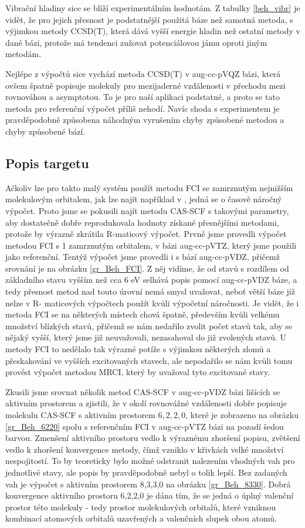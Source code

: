 Vibrační hladiny sice se blíží experimentálním hodnotám. Z tabulky \ref{beh_vibr} je 
vidět, že pro jejich přesnost je podstatnější použitá báze než samotná metoda, s 
výjimkou metody CCSD(T), která dává vyšší energie hladin než ostatní metody v dané 
bázi, protože má tendenci zužovat potenciálovou jámu oproti jiným metodám.

Nejlépe z výpočtů sice vychází metoda CCSD(T) v aug-cc-pVQZ bázi, která ovšem špatně popisuje
molekuly pro mezijaderné vzdálenosti v přechodu mezi rovnováhou a asymptotou.
To je pro naší aplikaci podstatné, a proto se tato metoda pro referenční výpočet příliš 
nehodí. Navíc shoda s experimentem je pravděpodobně způsobena náhodným vyrušením chyby způsobené metodou a chyby způsobené bází.

\subsection{Popis targetu}
Ačkoliv lze pro takto malý systém použít metodu FCI se zamrznutým nejnižším molekulovým 
orbitalem, jak lze najít například v \cite{BeH-Rmat}, jedná se o časově náročný 
výpočet. Proto jsme se pokusili najít metodu CAS-SCF s takovými parametry, aby 
dostatečně dobře reprodukovala hodnoty získané přesnějšími metodami, protože by výrazně 
zkrátila R-maticový výpočet.
Prvně jsme provedli výpočet metodou FCI s 1 zamrznutým orbitalem, v bázi aug-cc-pVTZ, 
který jsme použili jako referenční. Tentýž výpočet jsme provedli i s bází aug-cc-pVDZ, 
přičemž srovnání je na obrázku \ref{gr_Beh_FCI}. Z něj vidíme, že od stavů s rozdílem 
od základního stavu vyšším než cca 6 eV selhává popis pomocí aug-cc-pVDZ báze, a tedy 
přesnost metod nad touto úrovní nemá smysl uvažovat, neboť větší báze již nelze v R-
maticových výpočtech použít kvůli výpočetní náročnosti. Je vidět, že i metoda FCI se na 
některých místech chová špatně, především kvůli velkému množství blízkých stavů, 
přičemž se nám nedařilo zvolit počet stavů tak, aby se nějaký vyšší, který jsme již 
neuvažovali, nezasahoval do již zvolených stavů. U metody FCI to nedělalo tak výrazné 
potíže s výjimkou některých zlomů a přeskakování ve vyšších excitovaných stavech, ale  
nepodařilo se nám kvůli tomu provést výpočet metodou MRCI, který by uvažoval tyto 
excitované stavy.

Zkusili jsme srovnat několik metod CAS-SCF v aug-cc-pVDZ bázi lišících se aktivním 
prostorem a zjistili, že v okolí rovnovážné vzdálenosti dobře popisuje molekulu CAS-SCF 
s 
aktivním prostorem $6,2,2,0$, které je zobrazeno na obrázku \ref{gr_Beh_6220} spolu s 
referenčním FCI v aug-cc-pVTZ bázi na pozadí šedou barvou. Zmenšení
aktivního prostoru vedlo k výraznému zhoršení popisu, zvětšení vedlo k zhoršení 
konvergence metody, čímž vzniklo v křivkách velké množství nespojitostí. To by 
teoreticky bylo možné odstranit nalezením vhodných vah pro jednotlivé stavy, ale popis by pravděpodobně nebyl o tolik lepší. Bez zadaných vah je výpočet s aktivním prostorem 8,3,3,0 na obrázku \ref{gr_Beh_8330}.
Dobrá konvergence aktivního prostoru 6,2,2,0 je dána tím, že se jedná o úplný valenční 
prostor této molekuly - tedy prostor molekulových orbitalů, které vzniknou kombinací 
atomových orbitalů uzavřených a valenčních slupek obou atomů.

